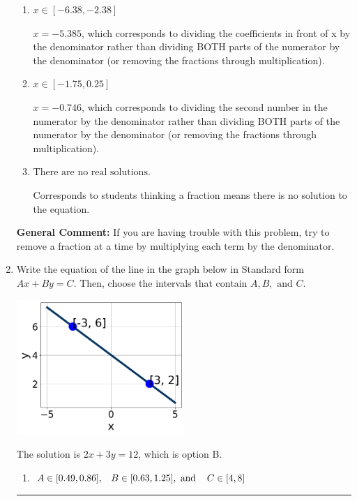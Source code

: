 \documentclass{extbook}[14pt]
\newcommand{\litem}[1]{\item #1

\rule{\textwidth}{0.4pt}}
\begin{document}
\begin{enumerate}
{\begin{enumerate}[label=\Alph*.]
 $x = 0.685$, which corresponds to not distributing the negative in front of the second fraction.
\item \( x \in [-6.38, -2.38] \)

 $x = -5.385$, which corresponds to dividing the coefficients in front of x by the denominator rather than dividing BOTH parts of the numerator by the denominator (or removing the fractions through multiplication).
\item \( x \in [-1.75, 0.25] \)

 $x = -0.746$, which corresponds to dividing the second number in the numerator by the denominator rather than dividing BOTH parts of the numerator by the denominator (or removing the fractions through multiplication).
\item \( \text{There are no real solutions.} \)

Corresponds to students thinking a fraction means there is no solution to the equation.
\end{enumerate}

\textbf{General Comment:} If you are having trouble with this problem, try to remove a fraction at a time by multiplying each term by the denominator.
}
\litem{
Write the equation of the line in the graph below in Standard form $Ax+By=C$. Then, choose the intervals that contain $A, B, \text{ and } C$.

\begin{center}
    \includegraphics[width=0.5\textwidth]{../Figures/linearGraphToStandardCopyB.png}
\end{center}



The solution is \( 2x + 3y = 12 \), which is option B.\begin{enumerate}[label=\Alph*.]
\item \( A \in [0.49, 0.86], \hspace{3mm} B \in [0.63, 1.25], \text{ and } \hspace{3mm} C \in [4, 8] \)


\end{enumerate}}
\end{enumerate}
\end{document}
